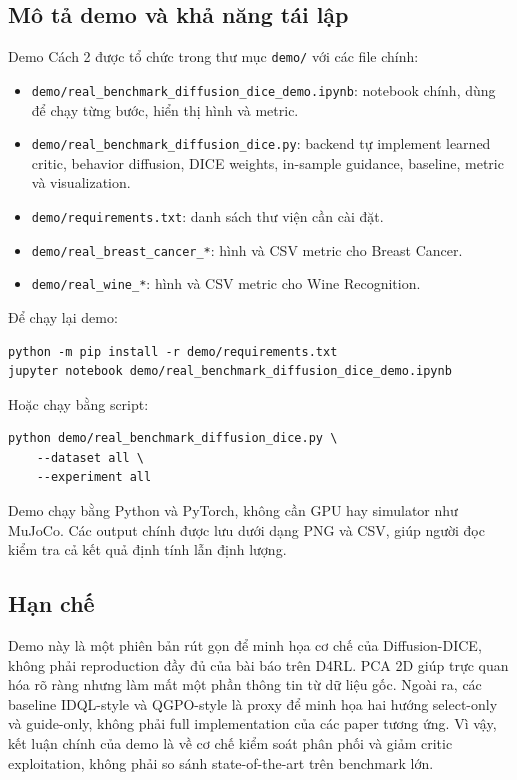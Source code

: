 \subsection{Mô tả demo và khả năng tái lập}
\label{sec:demo_description}

Demo Cách 2 được tổ chức trong thư mục \texttt{demo/} với các file chính:
\begin{itemize}
    \item \texttt{demo/real\_benchmark\_diffusion\_dice\_demo.ipynb}: notebook chính,
    dùng để chạy từng bước, hiển thị hình và metric.
    \item \texttt{demo/real\_benchmark\_diffusion\_dice.py}: backend tự implement
    learned critic, behavior diffusion, DICE weights, in-sample guidance, baseline,
    metric và visualization.
    \item \texttt{demo/requirements.txt}: danh sách thư viện cần cài đặt.
    \item \texttt{demo/real\_breast\_cancer\_*}: hình và CSV metric cho Breast Cancer.
    \item \texttt{demo/real\_wine\_*}: hình và CSV metric cho Wine Recognition.
\end{itemize}

Để chạy lại demo:
\begin{verbatim}
python -m pip install -r demo/requirements.txt
jupyter notebook demo/real_benchmark_diffusion_dice_demo.ipynb
\end{verbatim}
Hoặc chạy bằng script:
\begin{verbatim}
python demo/real_benchmark_diffusion_dice.py \
    --dataset all \
    --experiment all
\end{verbatim}

Demo chạy bằng Python và PyTorch, không cần GPU hay simulator như MuJoCo. Các output chính
được lưu dưới dạng PNG và CSV, giúp người đọc kiểm tra cả kết quả định tính lẫn định lượng.

\subsection{Hạn chế}

Demo này là một phiên bản rút gọn để minh họa cơ chế của Diffusion-DICE, không phải
reproduction đầy đủ của bài báo trên D4RL. PCA 2D giúp trực quan hóa rõ ràng nhưng làm mất
một phần thông tin từ dữ liệu gốc. Ngoài ra, các baseline IDQL-style và QGPO-style là proxy
để minh họa hai hướng select-only và guide-only, không phải full implementation của các paper
tương ứng. Vì vậy, kết luận chính của demo là về cơ chế kiểm soát phân phối và giảm critic
exploitation, không phải so sánh state-of-the-art trên benchmark lớn.
